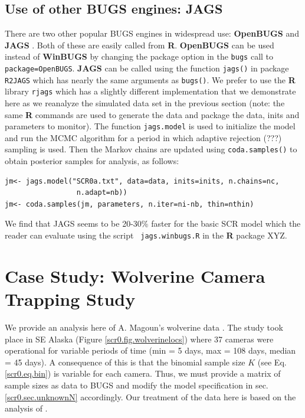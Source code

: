 \subsection{Use of other BUGS engines: JAGS}

There are two other popular BUGS engines in widespread use: {\bf OpenBUGS}
\citep{thomas_etal:2006} and {\bf JAGS} \citep{plummer:2003}. Both of these
are easily called from {\bf R}. {\bf OpenBUGS} can be used instead of
{\bf WinBUGS} by
changing the package option in the \mbox{\tt bugs} call to \mbox{\tt package=OpenBUGS}.
{\bf JAGS} can be called using the function \mbox{\tt jags()} in
package \mbox{\tt R2JAGS} which
has nearly the same arguments as \mbox{\tt bugs()}.  We prefer to use
the {\bf R}
library \mbox{\tt rjags} \citep{plummer:2009} which has a slightly different
implementation that we demonstrate here as we reanalyze the simulated
data set in the previous section (note: the same {\bf R} commands are used
to generate the data and package the data, inits and parameters to
monitor). The function \mbox{\tt jags.model} is used to initialize the model and
run the MCMC algorithm for a period in which adaptive rejection (???)
sampling is used. Then the Markov chains are updated using
\mbox{\tt coda.samples()} to obtain posterior samples for analysis, as follows:
\begin{verbatim}
jm<- jags.model("SCR0a.txt", data=data, inits=inits, n.chains=nc,
                 n.adapt=nb))
jm<- coda.samples(jm, parameters, n.iter=ni-nb, thin=nthin)
\end{verbatim}
We find that JAGS seems to be 20-30\% faster for the basic SCR model
which the reader can evaluate using the script \mbox{\tt
  jags.winbugs.R} in the {\bf R} package XYZ. 


\section{Case Study: Wolverine Camera Trapping Study}
\label{scr0.sec.wolverine}

We provide an analysis here of A. Magoun's wolverine data
\citep{magoun_etal:2011, royle_etal:2011}. The study took place in SE
Alaska (Figure \ref{scr0.fig.wolverinelocs}) where 37 cameras were
operational for variable periods of time (min = 5 days, max = 108
days, median = 45 days).  A consequence of this is that the binomial
sample size $K$ (see Eq. \ref{scr0.eq.bin})
 is variable for each camera. Thus, we
must provide a matrix of sample sizes as data to BUGS and modify the
model specification in sec. \ref{scr0.sec.unknownN}
accordingly. Our treatment of the
data here is based on the analysis of  \citet{royle_etal:2011}.

